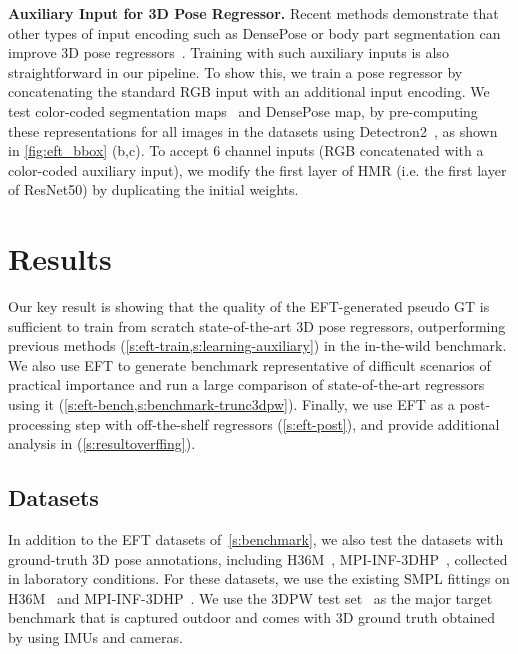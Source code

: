 \documentclass[10pt,twocolumn,letterpaper]{article}
\begin{document}
	\noindent \textbf{Auxiliary Input for 3D Pose Regressor.}
	Recent methods demonstrate that other types of input encoding such as DensePose or body part segmentation can improve 3D pose regressors~\cite{guler2018densepose, xu2019denserac, rong2019delving, alldieck2019learning}.
	Training with such auxiliary inputs is also straightforward in our pipeline.
	To show this, we train a pose regressor by concatenating the standard RGB input with an additional input encoding.
	We test color-coded segmentation maps~\cite{kirillov2019panoptic, kirillov2020pointrend} and DensePose map, by pre-computing these representations for all images in the datasets using Detectron2~\cite{wu2019detectron2}, as shown in \cref{fig:eft_bbox} (b,c). To accept 6 channel inputs (RGB concatenated with a color-coded auxiliary input), we modify the first layer of HMR (i.e. the first layer of ResNet50) by duplicating the initial weights.
	
	


	\section{Results}\label{s:results}
	
	Our key result is showing that the quality of the EFT-generated pseudo GT is sufficient to train from scratch state-of-the-art 3D pose regressors, outperforming previous methods (\cref{s:eft-train,s:learning-auxiliary}) in the in-the-wild benchmark.
	We also use EFT to generate benchmark representative of difficult scenarios of practical importance and run a large comparison of state-of-the-art regressors using it (\cref{s:eft-bench,s:benchmark-trunc3dpw}).
	Finally, we use EFT as a post-processing step with off-the-shelf regressors (\cref{s:eft-post}), and provide additional analysis in (\cref{s:resultoverffing}).
	
	\subsection{Datasets}\label{s:datasets}
	
	In addition to the EFT datasets of~\cref{s:benchmark}, we also test the datasets with ground-truth 3D pose annotations, including H36M~\cite{h36m_pami, ionescu2011latent}, MPI-INF-3DHP~\cite{mehta2017monocular}, collected in laboratory conditions.
For these datasets, we use the existing SMPL fittings on H36M~\cite{kanazawa2018end} and MPI-INF-3DHP~\cite{kanazawa2018end, kolotouros2019spin}.
	We use the 3DPW test set~\cite{vonMarcard2018} as the major target benchmark that is captured outdoor and comes with 3D ground truth obtained by using IMUs and cameras.
	
\end{document}
